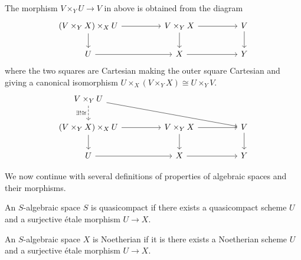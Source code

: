 \begin{remark}
    The morphism $V\times_{Y}U\to V$ in  above is obtained from the diagram 
    $$%
    \begin{tikzcd}
        {\left(V\times_{Y}X\right)\times_{X}U} && {V\times_{Y}X} && V \\
        U && X && Y
        \arrow[from=2-1, to=2-3]
        \arrow[from=1-5, to=2-5]
        \arrow[from=2-3, to=2-5]
        \arrow[from=1-3, to=2-3]
        \arrow[from=1-3, to=1-5]
        \arrow[from=1-1, to=2-1]
        \arrow[from=1-1, to=1-3]
    \end{tikzcd}$$
    where the two squares are Cartesian making the outer square Cartesian and giving a canonical isomorphism $U\times_{X}\left(V\times_{Y}X\right)\cong U\times_{Y}V$. 
    $$%
    \begin{tikzcd}
        {V\times_{Y}U} \\
        {\left(V\times_{Y}X\right)\times_{X}U} && {V\times_{Y}X} && V \\
        U && X && Y
        \arrow[from=3-1, to=3-3]
        \arrow[from=2-5, to=3-5]
        \arrow[from=3-3, to=3-5]
        \arrow[from=2-3, to=3-3]
        \arrow[from=2-3, to=2-5]
        \arrow[from=2-1, to=3-1]
        \arrow[from=2-1, to=2-3]
        \arrow["{\exists!\cong}"', dashed, from=1-1, to=2-1]
        \arrow[from=1-1, to=2-5]
    \end{tikzcd}$$
\end{remark}
We now continue with several definitions of properties of algebraic spaces and their morphisms. 
\begin{definition}\label{def: quasicompact algebraic space}
    An $S$-algebraic space $S$ is quasicompact if there exists a quasicompact scheme $U$ and a surjective \'{e}tale morphism $U\to X$. 
\end{definition}
\begin{definition}\label{def: Noetherian algebraic space}
    An $S$-algebraic space $X$ is Noetherian if it is there exists a Noetherian scheme $U$ and a surjective \'{e}tale morphism $U\to X$. 
\end{definition}
